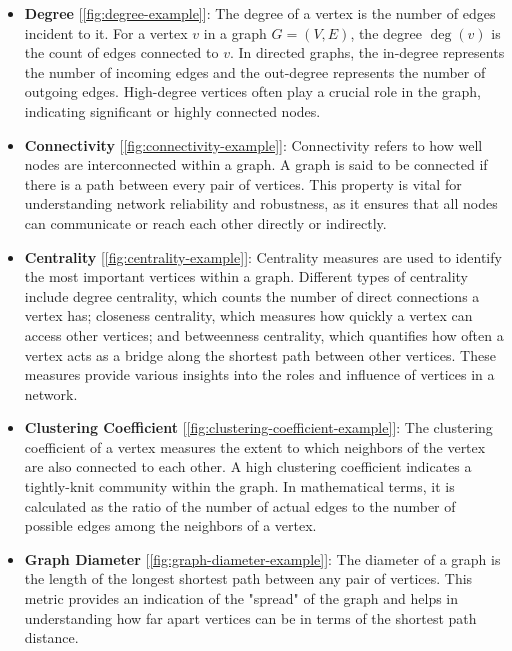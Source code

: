 \documentclass[../Thesis.tex]{subfiles}
\begin{document}
	\begin{itemize}
		\item \textbf{Degree} [\autoref{fig:degree-example}]: The degree of a vertex is the number of edges incident to it. For a vertex \( v \) in a graph \( G = (V, E) \), the degree \( \deg(v) \) is the count of edges connected to \( v \). In directed graphs, the in-degree represents the number of incoming edges and the out-degree represents the number of outgoing edges. High-degree vertices often play a crucial role in the graph, indicating significant or highly connected nodes.
		
		
		\item \textbf{Connectivity} [\autoref{fig:connectivity-example}]: Connectivity refers to how well nodes are interconnected within a graph. A graph is said to be connected if there is a path between every pair of vertices. This property is vital for understanding network reliability and robustness, as it ensures that all nodes can communicate or reach each other directly or indirectly.
		
		
		\item \textbf{Centrality} [\autoref{fig:centrality-example}]: Centrality measures are used to identify the most important vertices within a graph. Different types of centrality include degree centrality, which counts the number of direct connections a vertex has; closeness centrality, which measures how quickly a vertex can access other vertices; and betweenness centrality, which quantifies how often a vertex acts as a bridge along the shortest path between other vertices. These measures provide various insights into the roles and influence of vertices in a network.
		
		
		\item \textbf{Clustering Coefficient} [\autoref{fig:clustering-coefficient-example}]: The clustering coefficient of a vertex measures the extent to which neighbors of the vertex are also connected to each other. A high clustering coefficient indicates a tightly-knit community within the graph. In mathematical terms, it is calculated as the ratio of the number of actual edges to the number of possible edges among the neighbors of a vertex.
		
		
		\item \textbf{Graph Diameter} [\autoref{fig:graph-diameter-example}]: The diameter of a graph is the length of the longest shortest path between any pair of vertices. This metric provides an indication of the "spread" of the graph and helps in understanding how far apart vertices can be in terms of the shortest path distance.
		
		

\end{itemize}
\end{document}
